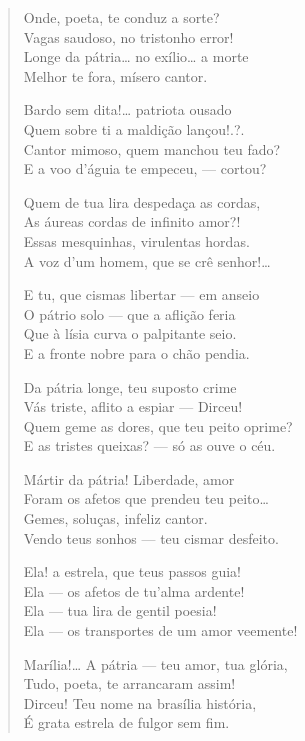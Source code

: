 \begin{verse}
Onde, poeta, te conduz a sorte?\\
Vagas saudoso, no tristonho error!\\
Longe da pátria\ldots{} no exílio\ldots{} a morte\\
Melhor te fora, mísero cantor.

Bardo sem dita!\ldots{} patriota ousado\\
Quem sobre ti a maldição lançou!.?.\\
Cantor mimoso, quem manchou teu fado?\\
E a voo d'águia te empeceu, --- cortou?

Quem de tua lira despedaça as cordas,\\
As áureas cordas de infinito amor?!\\
Essas mesquinhas, virulentas hordas.\\
A voz d'um homem, que se crê senhor!\ldots{}

E tu, que cismas libertar --- em anseio\\
O pátrio solo --- que a aflição feria\\
Que à lísia curva o palpitante seio.\\
E a fronte nobre para o chão pendia.

Da pátria longe, teu suposto crime\\
Vás triste, aflito a espiar --- Dirceu!\\
Quem geme as dores, que teu peito oprime?\\
E as tristes queixas? --- só as ouve o céu.

Mártir da pátria! Liberdade, amor\\
Foram os afetos que prendeu teu peito\ldots{}\\
Gemes, soluças, infeliz cantor.\\
Vendo teus sonhos --- teu cismar desfeito.

Ela! a estrela, que teus passos guia!\\
Ela --- os afetos de tu'alma ardente!\\
Ela --- tua lira de gentil poesia!\\
Ela --- os transportes de um amor veemente!

Marília!\ldots{} A pátria --- teu amor, tua glória,\\
Tudo, poeta, te arrancaram assim!\\
Dirceu! Teu nome na brasília história,\\
É grata estrela de fulgor sem fim.


\end{verse}
